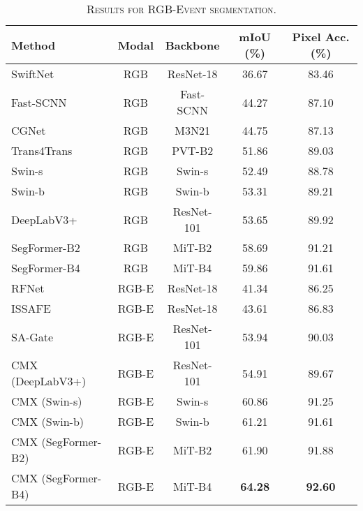 \documentclass[journal]{IEEEtran}
\begin{document}
\begin{table}[!t]
\begin{center}
        \caption{\textsc{Results for RGB-Event segmentation.}}
        \label{tab:rgb_event_result}
        
\setlength{\tabcolsep}{2pt}
\begin{tabular}{l|cc|cc}
    \toprule[1pt]
    \textbf{Method} & \textbf{Modal} & \textbf{Backbone} & \textbf{mIoU (\%)}  & \textbf{Pixel  Acc. (\%)}\\
    \midrule\midrule
    SwiftNet~\cite{orsic2019swiftnet} & RGB & ResNet-18 & 36.67 & 83.46 \\
    Fast-SCNN~\cite{Poudel2019FastSCNNFS} & RGB & Fast-SCNN & 44.27 & 87.10\\
    CGNet~\cite{Wu2021CGNetAL}  & RGB & M3N21 & 44.75 & 87.13\\
    Trans4Trans~\cite{zhang2021trans4trans_iccvw} & RGB & PVT-B2 & 51.86 & 89.03 \\ 
    Swin-s~\cite{liu2021swin} & RGB & Swin-s & 52.49 & 88.78 \\
    Swin-b~\cite{liu2021swin} & RGB & Swin-b & 53.31 & 89.21 \\
    DeepLabV3+~\cite{chen2018deeplabv3+} & RGB & ResNet-101 & 53.65 & 89.92 \\
    SegFormer-B2~\cite{xie2021segformer} & RGB & MiT-B2 & 58.69 & 91.21 \\
    SegFormer-B4~\cite{xie2021segformer} & RGB & MiT-B4 & 59.86 & 91.61 \\

    \midrule
    RFNet~\cite{sun2020rfnet} & RGB-E & ResNet-18 & 41.34 & 86.25 \\
    ISSAFE~\cite{zhang2021issafe} & RGB-E & ResNet-18 & 43.61 & 86.83 \\
    SA-Gate~\cite{chen2020sa_gate} & RGB-E & ResNet-101 & 53.94 & 90.03 \\ 

    \midrule
    CMX (DeepLabV3+) & RGB-E & ResNet-101 & 54.91 & 89.67\\
    CMX (Swin-s) & RGB-E & Swin-s & 60.86 & 91.25 \\
    CMX (Swin-b) & RGB-E & Swin-b & 61.21 & 91.61 \\
    CMX (SegFormer-B2) & RGB-E & MiT-B2 & 61.90 & 91.88 \\
    \rowcolor{gray!15} CMX (SegFormer-B4) & RGB-E & MiT-B4 & \textbf{64.28} & \textbf{92.60} \\
    \bottomrule
\end{tabular}     \end{center}
\end{table}
\end{document}

